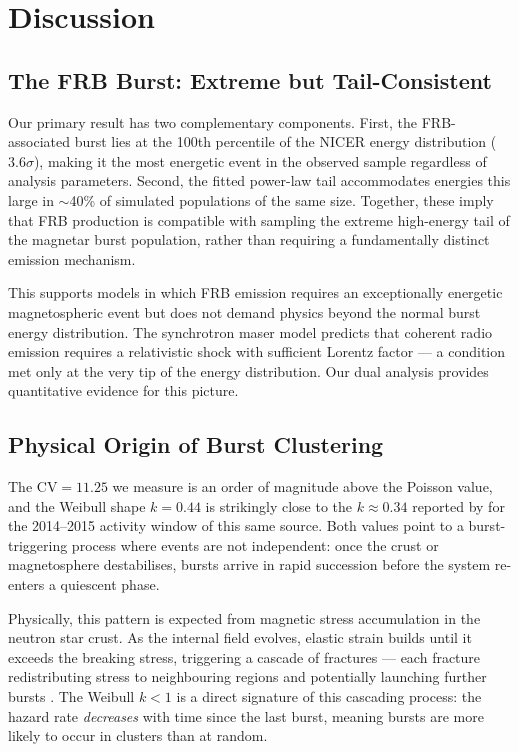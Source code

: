 \documentclass[12pt]{article}
\begin{document}
\section{Discussion}\label{sec:discussion}

\subsection{The FRB Burst: Extreme but Tail-Consistent}

Our primary result has two complementary components. First, the
FRB-associated burst lies at the 100th percentile of the NICER energy
distribution ($3.6\sigma$), making it the most energetic event in the
observed sample regardless of analysis parameters. Second, the fitted
power-law tail accommodates energies this large in $\sim$40\% of
simulated populations of the same size. Together, these imply that
FRB production is compatible with sampling the extreme high-energy tail
of the magnetar burst population, rather than requiring a fundamentally
distinct emission mechanism.

This supports models in which FRB emission requires an exceptionally
energetic magnetospheric event but does not demand physics beyond the
normal burst energy distribution. The synchrotron maser model
\citep{lyubarsky2014, metzger2019} predicts that coherent radio
emission requires a relativistic shock with sufficient Lorentz factor
--- a condition met only at the very tip of the energy distribution.
Our dual analysis provides quantitative evidence for this picture.

\subsection{Physical Origin of Burst Clustering}

The $\mathrm{CV} = 11.25$ we measure is an order of magnitude above the Poisson value, and the Weibull shape $k = 0.44$ is strikingly close to the $k \approx 0.34$ reported by \citet{lin2020} for the 2014--2015 activity window of this same source. Both values point to a burst-triggering process where events are not independent: once the crust or magnetosphere destabilises, bursts arrive in rapid succession before the system re-enters a quiescent phase.

Physically, this pattern is expected from magnetic stress accumulation in the neutron star crust. As the internal field evolves, elastic strain builds until it exceeds the breaking stress, triggering a cascade of fractures --- each fracture redistributing stress to neighbouring regions and potentially launching further bursts \citep{kaspi2017}. The Weibull $k < 1$ is a direct signature of this cascading process: the hazard rate \emph{decreases} with time since the last burst, meaning bursts are more likely to occur in clusters than at random.
\end{document}
